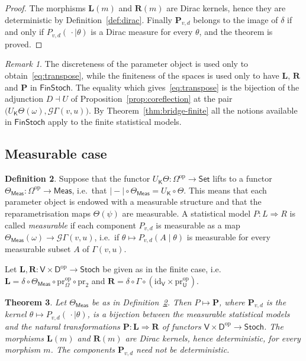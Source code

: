 \documentclass[11pt,a4paper]{article}
\theoremstyle{plain}
\newtheorem{theorem}{Theorem}[section]
\theoremstyle{definition}
\newtheorem{definition}[theorem]{Definition}
\theoremstyle{remark}
\newtheorem{remark}[theorem]{Remark}
\newcommand{\cat}[1]{\mathsf{#1}}
\newcommand{\catU}{\cat{U}}
\newcommand{\catV}{\cat{V}}
\newcommand{\catO}{\cat{\Omega}}
\newcommand{\catD}{\cat{D}}
\newcommand{\catK}{\cat{K}}
\newcommand{\Meas}{\cat{Meas}}
\newcommand{\Set}{\cat{Set}}
\newcommand{\Stoch}{\cat{Stoch}}
\newcommand{\FinStoch}{\cat{FinStoch}}
\newcommand{\G}{\mathcal{G}}
\newcommand{\op}{\mathrm{op}}
\newcommand{\id}{\mathrm{id}}
\newcommand{\pr}{\mathrm{pr}}
\newcommand{\del}{\delta}
\begin{document}
\begin{proof}
The morphisms $\mathbf{L}(m)$ and $\mathbf{R}(m)$ are Dirac kernels, hence
they are deterministic by Definition~\ref{def:dirac}. Finally
$\mathbf{P}_{v,d}$ belongs to the image of $\del$ if and only if
$P_{v,d}(\,\cdot \mid \theta)$ is a Dirac measure for every $\theta$, and the
theorem is proved.
\end{proof}

\begin{remark}\label{rem:bridge-finite}
The discreteness of the parameter object is used only to
obtain~\eqref{eq:transpose}, while the finiteness of the spaces is used only to
have $\mathbf{L}$, $\mathbf{R}$ and $\mathbf{P}$ in $\FinStoch$. The equality
which gives~\eqref{eq:transpose} is the bijection of the adjunction
$D \dashv U$ of Proposition~\ref{prop:coreflection} at the pair
$\bigl(U_\catK\Theta(\omega), \G\Gamma(v,u)\bigr)$. By
Theorem~\ref{thm:bridge-finite} all the notions available in $\FinStoch$ apply
to the finite statistical models.
\end{remark}

\subsection{Measurable case}

\begin{definition}\label{def:measurable-model}
Suppose that the functor $U_\catK\Theta \colon \catO^{\op} \to \Set$ lifts to a
functor $\Theta_\Meas \colon \catO^{\op} \to \Meas$, i.e.\ that
$|\!-\!| \circ \Theta_\Meas = U_\catK \circ \Theta$. This means that each
parameter object is endowed with a measurable structure and that the
reparametrisation maps $\Theta(\psi)$ are measurable. A statistical model
$P \colon L \Rightarrow R$ is called \emph{measurable} if each component
$P_{v,d}$ is measurable as a map $\Theta_\Meas(\omega) \to \G \Gamma(v,u)$,
i.e.\ if $\theta \mapsto P_{v,d}(A \mid \theta)$ is measurable for every
measurable subset $A$ of $\Gamma(v,u)$.
\end{definition}

Let $\mathbf{L}, \mathbf{R} \colon \catV \times \catD^{\op} \to \Stoch$ be
given as in the finite case, i.e.\
$\mathbf{L} = \del \circ \Theta_\Meas \circ \pr_\catO^{\op} \circ \pr_2$ and
$\mathbf{R} = \del \circ \Gamma \circ (\id_\catV \times \pr_\catU^{\op})$.

\begin{theorem}\label{thm:bridge-meas}
Let $\Theta_\Meas$ be as in Definition~\ref{def:measurable-model}. Then
$P \mapsto \mathbf{P}$, where $\mathbf{P}_{v,d}$ is the kernel
$\theta \mapsto P_{v,d}(\,\cdot \mid \theta)$, is a bijection between the
measurable statistical models and the natural transformations
$\mathbf{P} \colon \mathbf{L} \Rightarrow \mathbf{R}$ of functors
$\catV \times \catD^{\op} \to \Stoch$. The morphisms $\mathbf{L}(m)$ and
$\mathbf{R}(m)$ are Dirac kernels, hence deterministic, for every morphism
$m$. The components $\mathbf{P}_{v,d}$ need not be deterministic.
\end{theorem}
\end{document}
